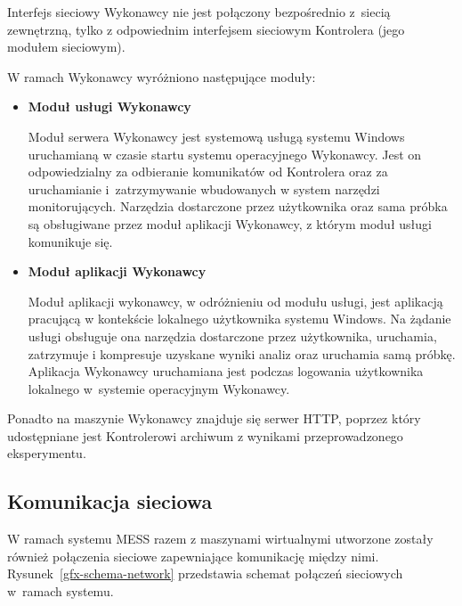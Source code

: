 \documentclass[a4paper,12pt,oneside]{article}
\begin{document}
\begin{itemize}
		Interfejs sieciowy Wykonawcy nie jest połączony bezpośrednio z~siecią zewnętrzną, tylko z odpowiednim interfejsem sieciowym Kontrolera (jego modułem sieciowym).
		
		W ramach Wykonawcy wyróżniono następujące moduły:
		
		\begin{itemize}
			\item \textbf{Moduł usługi Wykonawcy}
			
			Moduł serwera Wykonawcy jest systemową usługą systemu Windows uruchamianą w czasie startu systemu operacyjnego Wykonawcy. Jest on odpowiedzialny za odbieranie komunikatów od Kontrolera oraz za uruchamianie i~zatrzymywanie wbudowanych w system narzędzi monitorujących. Narzędzia dostarczone przez użytkownika oraz sama próbka są obsługiwane przez moduł aplikacji Wykonawcy, z którym moduł usługi komunikuje się.
			
			\item \textbf{Moduł aplikacji Wykonawcy}
			
			Moduł aplikacji wykonawcy, w odróżnieniu od modułu usługi, jest aplikacją pracującą w kontekście lokalnego użytkownika systemu Windows. Na żądanie usługi obsługuje ona narzędzia dostarczone przez użytkownika, uruchamia, zatrzymuje i kompresuje uzyskane wyniki analiz oraz uruchamia samą próbkę. Aplikacja Wykonawcy uruchamiana jest podczas logowania użytkownika lokalnego w~systemie operacyjnym Wykonawcy.
		\end{itemize}
		
		Ponadto na maszynie Wykonawcy znajduje się serwer HTTP, poprzez który udostępniane jest Kontrolerowi archiwum z wynikami przeprowadzonego eksperymentu.
		 
	\end{itemize}

	\subsection{Komunikacja sieciowa}
	
	W ramach systemu MESS razem z maszynami wirtualnymi utworzone zostały również połączenia sieciowe zapewniające komunikację między nimi. Rysunek~\ref{gfx-schema-network} przedstawia schemat połączeń sieciowych w~ramach systemu.
	
\end{document}
